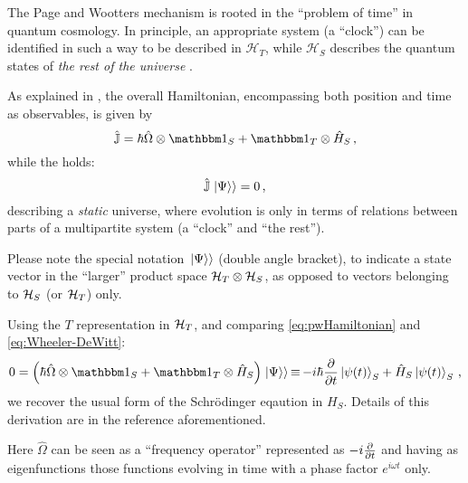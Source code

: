 
The Page and Wootters mechanism is rooted in the ``problem of time''
in quantum cosmology.
In principle, an appropriate system (a ``clock'') can be identified in such a way
to be described in $\mathcal{H}_T$, while $\mathcal{H}_S$ describes
the quantum states of \emph{the rest of the universe} \parencite{Marletto:Evolution}.

As explained in \cite{Lloyd:Time, Maccone:Pauli}, the overall Hamiltonian,
encompassing both position and time as observables, is given by
\begin{equation}\label{eq:pwHamiltonian}
  \hat{\mathbb{J}} = \hbar\hat{\Omega}\ox\idop_S + \idop_T\ox\hat{H}_S \,\text{,}
\end{equation}
while the  holds:
\begin{equation}\label{eq:Wheeler-DeWitt}
  \hat{\mathbb{J}}\left.\left| \Psi \right\rangle\right\rangle = 0 \,\text{,}
\end{equation}
describing a \emph{static} universe, where evolution is only
in terms of relations between parts of a multipartite system
(a ``clock'' and ``the rest'').

Please note the special notation $\left.\left| \Psi \right\rangle\right\rangle$ (double angle bracket),
to indicate a state vector in the ``larger'' product space $\mathcal{H}_T \otimes \mathcal{H}_S$,
as opposed to vectors belonging to $\mathcal{H}_S$ (or $\mathcal{H}_T$) only.

Using the $T$ representation in $\mathcal{H}_T$,
and comparing \eqref{eq:pwHamiltonian} and \eqref{eq:Wheeler-DeWitt}:
\begin{equation}\label{eq:schrod_from_pw}
  0 = \qty(\hbar\hat{\Omega}\ox\idop_S + \idop_{T}\ox\hat{H}_S)\dket{\Psi}
    \repr -i\hbar\pdv{t}\ket{\psi(t)}_{S} + \hat{H}_S\ket{\psi(t)}_{S}
    \,\text{,}
\end{equation}
we recover the usual form of the Schr\"{o}dinger eqaution in $H_S$.
Details of this derivation are in the reference aforementioned.

Here $\hat{\Omega}$ can be seen as a ``frequency operator''
represented as $-i\pdv{t}$ and having as eigenfunctions
those functions evolving in time with a phase factor $e^{i \omega t}$ only.

